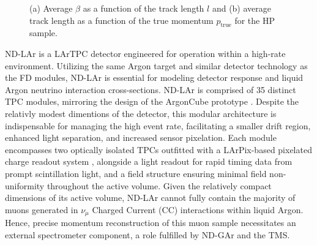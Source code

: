 \begin{figure}[!t]
\begin{subfigure}[b]{0.39\textwidth}
         \caption{}
         \label{fig:NDLArModule}
     \end{subfigure}
        \caption{(a) Average $\beta$ as a function of the track length $l $ and  (b) average track length as a function of the true momentum $p_\textrm{true}$ for the HP sample.}
        \label{fig:ND-Larview}
\end{figure}

ND-LAr is a LArTPC detector engineered for operation within a high-rate environment. Utilizing the same Argon target and similar detector technology as the FD modules, ND-LAr is essential for modeling detector response and liquid Argon neutrino interaction cross-sections. ND-LAr is comprised of 35 distinct TPC modules, mirroring the design of the ArgonCube prototype \cite{Dwyer:2018phu}. Despite the relativly modest dimentions of the detector, this modular architecture is indispensable for managing the high event rate, facilitating a smaller drift region, enhanced light separation, and increased sensor pixelation. Each module encompasses two optically isolated TPCs outfitted with a LArPix-based pixelated charge readout system  \cite{Goldi:2018mbo}, alongside a light readout for rapid timing data from prompt scintillation light, and a field structure ensuring minimal field non-uniformity throughout the active volume. Given the relatively compact dimensions of its active volume, ND-LAr cannot fully contain the majority of muons generated in $\nu_\mu$ Charged Current (CC) interactions within liquid Argon. Hence, precise momentum reconstruction of this muon sample necessitates an external spectrometer component, a role fulfilled by ND-GAr and the TMS.

